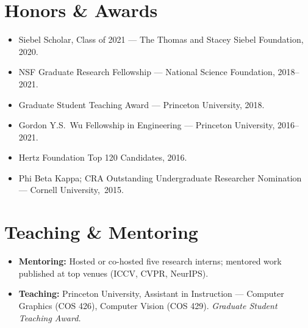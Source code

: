 \documentclass[10.5pt]{article}
\begin{document}
\section{Honors \& Awards}

\begin{itemize}
  \item Siebel Scholar, Class of 2021 --- The Thomas and Stacey Siebel Foundation, 2020.
  \item NSF Graduate Research Fellowship --- National Science Foundation, 2018--2021.
  \item Graduate Student Teaching Award --- Princeton University, 2018.
  \item Gordon Y.S.\ Wu Fellowship in Engineering --- Princeton University, 2016--2021.
  \item Hertz Foundation Top 120 Candidates, 2016.
  \item Phi Beta Kappa; CRA Outstanding Undergraduate Researcher Nomination --- Cornell University,~2015.
\end{itemize}

\section{Teaching \& Mentoring}

\begin{itemize}
  \item \textbf{Mentoring:} Hosted or co-hosted five research interns; mentored work published at top venues (ICCV, CVPR, NeurIPS).
  \item \textbf{Teaching:} Princeton University, Assistant in Instruction --- Computer Graphics (COS 426), Computer Vision (COS 429). \textit{Graduate Student Teaching Award.}
\end{itemize}
\end{document}

